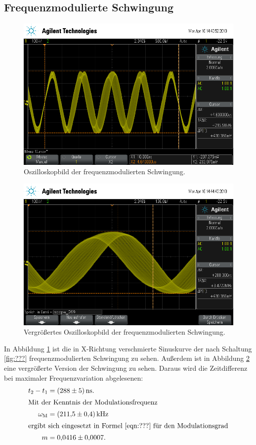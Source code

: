 \subsection{Frequenzmodulierte Schwingung}

\begin{figure}[H]
  \centering
  \includegraphics[width=\textwidth]{Oszi_Pics/freqModRing.png}
  \caption{Oszilloskopbild der frequenzmodulierten Schwingung.}
  \label{fig:freqModRing}
\end{figure}

\begin{figure}[H]
  \centering
  \includegraphics[width=\textwidth]{Oszi_Pics/freqModZoom.png}
  \caption{Vergrößertes Oszilloskopbild der frequenzmodulierten Schwingung.}
  \label{fig:freqModZoom}
\end{figure}

In Abbildung \ref{fig:freqModRing} ist die in X-Richtung verschmierte Sinuskurve der nach Schaltung \ref{fig:???} frequenzmodulierten Schwingung zu sehen. Außerdem ist in Abbildung \ref{fig:freqModZoom} eine vergrößerte Version der Schwingung zu sehen. Daraus wird die Zeitdifferenz bei maximaler Frequenzvariation abgelesenen:
\begin{align*}
  t_2 - t_1 &= \SI{288(5)}{\nano\second}.\\
\intertext{Mit der Kenntnis der Modulationsfrequenz}
  \omega_\text{M} &= \SI{211.5(4)}{\kilo\hertz}\\
\intertext{ergibt sich eingesetzt in Formel \eqref{eqn:???} für den Modulationsgrad}
  m &= \num{0.0416(7)}.
\end{align*}


